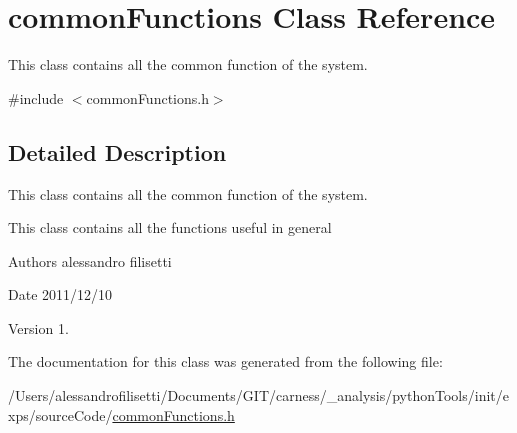 \hypertarget{a00013}{\section{common\-Functions Class Reference}
\label{a00013}
}


This class contains all the common function of the system.  




{\ttfamily \#include $<$common\-Functions.\-h$>$}



\subsection{Detailed Description}
This class contains all the common function of the system. 

This class contains all the functions useful in general \begin{DoxyAuthor}{Authors}
alessandro filisetti 
\end{DoxyAuthor}
\begin{DoxyDate}{Date}
2011/12/10 
\end{DoxyDate}
\begin{DoxyVersion}{Version}
1. 
\end{DoxyVersion}


The documentation for this class was generated from the following file\-:\begin{DoxyCompactItemize}
\item 
/\-Users/alessandrofilisetti/\-Documents/\-G\-I\-T/carness/\-\_\-analysis/python\-Tools/init/exps/source\-Code/\hyperlink{a00058}{common\-Functions.\-h}\end{DoxyCompactItemize}
